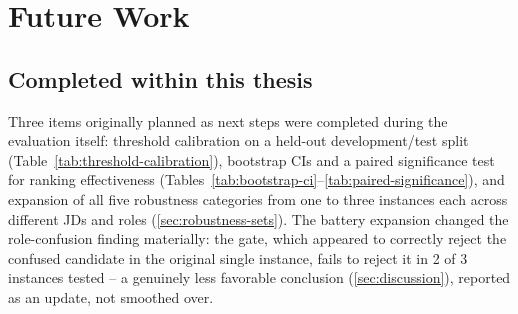 \documentclass[12pt,a4paper,oneside]{report}
\begin{document}
\section{Future Work}
\label{sec:future-work}

\subsection{Completed within this thesis}
Three items originally planned as next steps were completed during the evaluation itself: threshold calibration on a held-out development/test split (Table~\ref{tab:threshold-calibration}), bootstrap CIs and a paired significance test for ranking effectiveness (Tables~\ref{tab:bootstrap-ci}--\ref{tab:paired-significance}), and expansion of all five robustness categories from one to three instances each across different JDs and roles (\cref{sec:robustness-sets}). The battery expansion changed the role-confusion finding materially: the gate, which appeared to correctly reject the confused candidate in the original single instance, fails to reject it in 2 of 3 instances tested -- a genuinely less favorable conclusion (\cref{sec:discussion}), reported as an update, not smoothed over.
\end{document}
